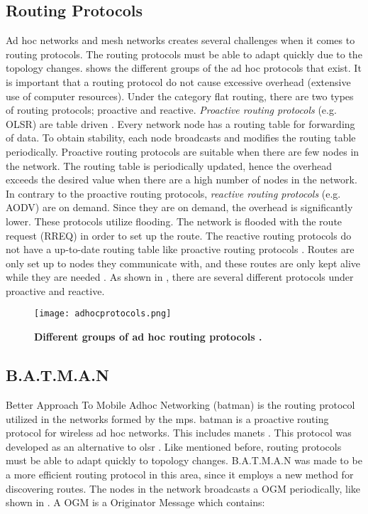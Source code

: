 \subsection{Routing Protocols}
Ad hoc networks and mesh networks creates several challenges when it comes to routing protocols. The routing protocols must be able to adapt quickly due to the topology changes.  shows the different groups of the ad hoc protocols that exist. It is important that a routing protocol do not cause excessive overhead (extensive use of computer resources). Under the category flat routing, there are two types of routing protocols; proactive and reactive. \textit{Proactive routing protocols} (e.g. OLSR) are table driven \citep{proactivereactive}. Every network node has a routing table for forwarding of data. To obtain stability, each node broadcasts and modifies the routing table periodically. Proactive routing protocols are suitable when there are few nodes in the network. The routing table is periodically updated, hence the overhead exceeds the desired value when there are a high number of nodes in the network. In contrary to the proactive routing protocols, \textit{reactive routing protocols} (e.g. AODV) are on demand. Since they are on demand, the overhead is significantly lower. These protocols utilize flooding. The network is flooded with the route request (RREQ) in order to set up the route. The reactive routing protocols do not have a up-to-date routing table like proactive routing protocols \cite{proactivereactive}. Routes are only set up to nodes they communicate with, and these routes are only kept alive while they are needed  \cite{adhoc2}. As shown in , there are several different protocols under proactive and reactive. 


\begin{figure}[t]
  \centering
    \texttt{[image: adhocprotocols.png]}
     \caption[Ad Hoc routing protocols]{\textbf{Different groups of ad hoc routing protocols \cite{adhoc}.}}
\label{fig:adhocprotocols}
\end{figure}


\subsection{B.A.T.M.A.N}
\label{subsec:batman}
Better Approach To Mobile Adhoc Networking (\gls{batman}) is the routing protocol utilized in the networks formed by the \glspl{mp}. \gls{batman} is a proactive routing protocol for wireless ad hoc networks. This includes \glspl{manet} \cite{batman}. This protocol was developed as an alternative to \gls{olsr} \cite{batman2}. Like mentioned before, routing protocols must be able to adapt quickly to topology changes. B.A.T.M.A.N was made to be a more efficient routing protocol in this area, since it employs a new method for discovering routes. The nodes in the network broadcasts a OGM periodically, like shown in . A OGM is a Originator Message which contains: 

